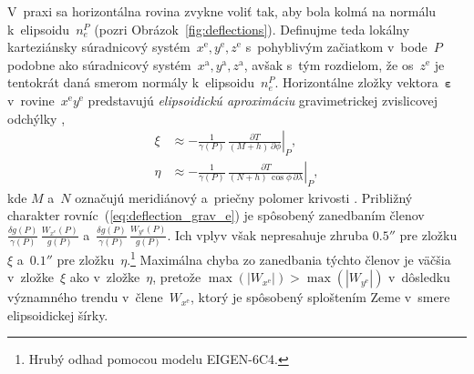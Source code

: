 \documentclass[a4paper, 12pt]{book}
\begin{document}
V~praxi sa horizontálna rovina zvykne voliť tak, aby bola kolmá na normálu 
k~elipsoidu~$n_e^P$ (pozri Obrázok~\ref{fig:deflections}).  Definujme teda 
lokálny karteziánsky súradnicový systém~$x^\mathrm{e}, y^\mathrm{e}, 
z^\mathrm{e}$ s~pohyblivým začiatkom v~bode~$P$ podobne ako súradnicový 
systém~$x^\mathrm{a}, y^\mathrm{a}, z^\mathrm{a}$, avšak s~tým rozdielom, že 
os~$z^\mathrm{e}$ je tentokrát daná smerom normály k~elipsoidu~$n_e^P$.  
Horizontálne zložky vektora~$\boldsymbol\varepsilon$ 
v~rovine~$x^\mathrm{e}y^\mathrm{e}$ predstavujú \emph{elipsoidickú aproximáciu} 
gravimetrickej zvislicovej odchýlky \parencite{Jekeli1999b},
%
\begin{equation}
\label{eq:deflection_grav_e}
\begin{split}
\xi &\approx -\frac{1}{\gamma(P)} \, \left.\frac{\partial T}{(M + h) \, 
\partial \phi}\right|_P{,}\\
%
\eta &\approx -\frac{1}{\gamma(P)} \, \left.\frac{\partial T}{(N + h) \, 
\cos\phi \, \partial \lambda}\right|_P{,}
\end{split}
\end{equation}
%
kde $M$ a~$N$ označujú meridiánový a~priečny polomer krivosti \parencite[pozri 
napríklad][]{MoritzPhysicalGeodesy}.  Približný charakter 
rovníc~(\ref{eq:deflection_grav_e}) je spôsobený zanedbaním 
členov~$\frac{\delta g(P)}{\gamma(P)} \, \frac{W_{x^\mathrm{e}}(P)}{g(P)}$ 
a~$\frac{\delta g(P)}{\gamma(P)} \, \frac{W_{y^\mathrm{e}}(P)}{g(P)}$.  Ich 
vplyv však nepresahuje zhruba $0.5''$ pre zložku~$\xi$ a~$0.1''$ pre 
zložku~$\eta$.\footnote{Hrubý odhad pomocou modelu EIGEN-6C4.}  Maximálna chyba 
zo zanedbania týchto členov je väčšia v~zložke~$\xi$ ako v~zložke~$\eta$, 
pretože $\max(|W_{x^\mathrm{e}}|) > \max(|W_{y^\mathrm{e}}|)$ v~dôsledku 
významného trendu v~člene~$W_{x^\mathrm{e}}$, ktorý je spôsobený sploštením 
Zeme v~smere elipsoidickej šírky.
\end{document}
